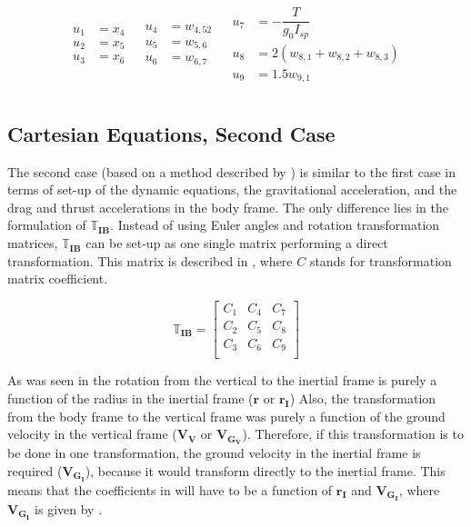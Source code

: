 \begin{align} \label{eq:restAuxD}
\begin{split}
u_{1} &= x_{4} \\
u_{2} &= x_{5} \\
u_{3} &= x_{6} \\
\end{split}
&
\begin{split}
u_{4} &= w_{4,52} \\
u_{5} &= w_{5,6} \\
u_{6} &= w_{6,7} \\
\end{split}
&
\begin{split}
u_{7} &= -\dfrac{T}{g_{0}I_{sp}} \\
u_{8} &= 2\left(w_{8,1}+w_{8,2}+w_{8,3}\right)\\
u_{9} &= 1.5 w_{9,1} \\
\end{split}
\end{align}

 
\subsection{Cartesian Equations, Second Case}
\label{subsec:careq2}
The second case (based on a method described by \citep{bergsma2015application}) is similar to the first case in terms of set-up of the dynamic equations, the gravitational acceleration, and the drag and thrust accelerations in the body frame. The only difference lies in the formulation of $\mathbb{T}_{\mathbf{IB}}$. Instead of using Euler angles and rotation transformation matrices, $\mathbb{T}_{\mathbf{IB}}$ can be set-up as one single matrix performing a direct transformation. This matrix is described in , where $C$ stands for transformation matrix coefficient. 

\begin{equation} \label{eq:transMatCoef}
\mathbb{T}_{\mathbf{IB}} = 
\left[
\begin{matrix}
C_{1} & C_{4} & C_{7} \\
C_{2} & C_{5} & C_{8} \\
C_{3} & C_{6} & C_{9} \\
\end{matrix}
\right]
\end{equation}


\noindent
As was seen in  the rotation from the vertical to the inertial frame is purely a function of the radius in the inertial frame ($\mathbf{r}$ or $\mathbf{r_{I}}$) Also, the transformation from the body frame to the vertical frame was purely a function of the ground velocity in the vertical frame ($\mathbf{V_{V}}$ or $\mathbf{V_{G_{V}}}$). Therefore, if this transformation is to be done in one transformation, the ground velocity in the inertial frame is required ($\mathbf{V_{G_{I}}}$), because it would transform directly to the inertial frame. This means that the coefficients in  will have to be a function of $\mathbf{r_{I}}$ and $\mathbf{V_{G_{I}}}$, where $\mathbf{V_{G_{I}}}$ is given by .

